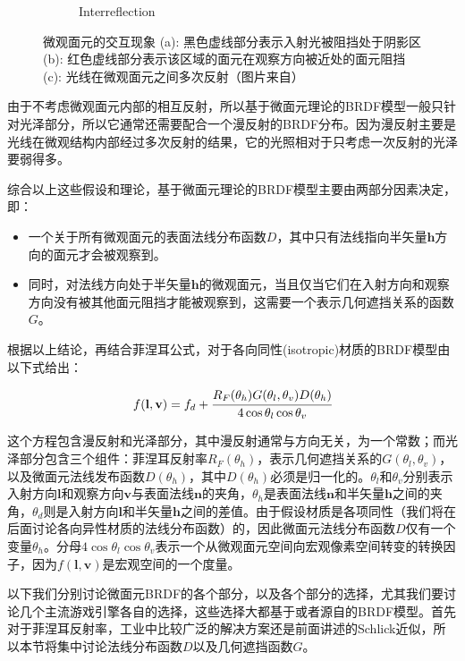 \begin{figure}
\begin{subfigure}[b]{0.283\textwidth}
		\caption{Interreflection}
	\end{subfigure}
\caption{微观面元的交互现象 (a): 黑色虚线部分表示入射光被阻挡处于阴影区 (b): 红色虚线部分表示该区域的面元在观察方向被近处的面元阻挡 (c): 光线在微观面元之间多次反射（图片来自\cite{b:rtr}）}
\label{f:intro-microfacet-effect}
\end{figure}

由于不考虑微观面元内部的相互反射，所以基于微面元理论的BRDF模型一般只针对光泽部分，所以它通常还需要配合一个漫反射的BRDF分布。因为漫反射主要是光线在微观结构内部经过多次反射的结果，它的光照相对于只考虑一次反射的光泽要弱得多。


综合以上这些假设和理论，基于微面元理论的BRDF模型主要由两部分因素决定，即：

\begin{itemize}
	\item 一个关于所有微观面元的表面法线分布函数$D$，其中只有法线指向半矢量$\mathbf{h}$方向的面元才会被观察到。
	\item 同时，对法线方向处于半矢量$\mathbf{h}$的微观面元，当且仅当它们在入射方向和观察方向没有被其他面元阻挡才能被观察到，这需要一个表示几何遮挡关系的函数$G$。
\end{itemize}

根据以上结论，再结合菲涅耳公式，对于各向同性(isotropic)材质的BRDF模型由以下式给出：

\begin{equation}
	f(\mathbf{l},\mathbf{v})=f_d+ \cfrac{R_F(\theta_h)G(\theta_l,\theta_v)D(\theta_h)}{4\cos\theta_l \cos\theta_v}
\end{equation}

\noindent 这个方程包含漫反射和光泽部分，其中漫反射通常与方向无关，为一个常数；而光泽部分包含三个组件：菲涅耳反射率$R_F(\theta_h)$，表示几何遮挡关系的$G(\theta_l,\theta_v)$，以及微面元法线发布函数$D(\theta_h)$，其中$D(\theta_h)$必须是归一化的。$\theta_l$和$\theta_v$分别表示入射方向$\mathbf{l}$和观察方向$\mathbf{v}$与表面法线$\mathbf{n}$的夹角，$\theta_h$是表面法线$\mathbf{n}$和半矢量$\mathbf{h}$之间的夹角，$\theta_d$则是入射方向$\mathbf{l}$和半矢量$\mathbf{h}$之间的差值。由于假设材质是各项同性（我们将在后面讨论各向异性材质的法线分布函数）的，因此微面元法线分布函数$D$仅有一个变量$\theta_h$。分母$4\cos\theta_l \cos\theta_v$表示一个从微观面元空间向宏观像素空间转变的转换因子，因为$f(\mathbf{l},\mathbf{v})$是宏观空间的一个度量。


以下我们分别讨论微面元BRDF的各个部分，以及各个部分的选择，尤其我们要讨论几个主流游戏引擎各自的选择，这些选择大都基于或者源自\cite{a:PhysicallyBasedShadingatDisney}的BRDF模型。首先对于菲涅耳反射率，工业中比较广泛的解决方案还是前面讲述的Schlick近似，所以本节将集中讨论法线分布函数$D$以及几何遮挡函数$G$。




